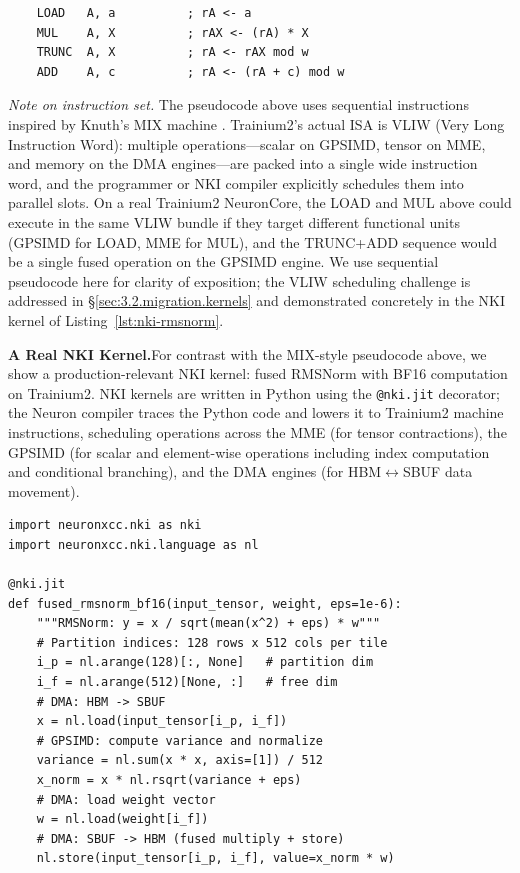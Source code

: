 \documentclass[12pt]{article}
\newcommand{\SBUF}{\textsc{SBUF}}                 %
\newcommand{\MME}{\textsc{MME}}                   %
\newcommand{\GPSIMD}{\textsc{GPSIMD}}             %
\begin{document}
\begin{verbatim}
    LOAD   A, a          ; rA <- a
    MUL    A, X          ; rAX <- (rA) * X
    TRUNC  A, X          ; rA <- rAX mod w
    ADD    A, c          ; rA <- (rA + c) mod w
\end{verbatim}

\noindent\textit{Note on instruction set.} The pseudocode above uses sequential instructions inspired by Knuth's MIX machine \citep{knuth1997taocp2}. Trainium2's actual ISA is VLIW (Very Long Instruction Word): multiple operations---scalar on \GPSIMD{}, tensor on \MME{}, and memory on the DMA engines---are packed into a single wide instruction word, and the programmer or NKI compiler explicitly schedules them into parallel slots. On a real Trainium2 NeuronCore, the LOAD and MUL above could execute in the same VLIW bundle if they target different functional units (\GPSIMD{} for LOAD, \MME{} for MUL), and the TRUNC+ADD sequence would be a single fused operation on the \GPSIMD{} engine. We use sequential pseudocode here for clarity of exposition; the VLIW scheduling challenge is addressed in \S\ref{sec:3.2.migration.kernels} and demonstrated concretely in the NKI kernel of Listing~\ref{lst:nki-rmsnorm}.

\medskip
\medskip\noindent\textbf{A Real NKI Kernel.}\quad For contrast with the MIX-style pseudocode above, we show a production-relevant NKI kernel: fused RMSNorm with BF16 computation on Trainium2. NKI kernels are written in Python using the \texttt{@nki.jit} decorator; the Neuron compiler traces the Python code and lowers it to Trainium2 machine instructions, scheduling operations across the \MME{} (for tensor contractions), the \GPSIMD{} (for scalar and element-wise operations including index computation and conditional branching), and the DMA engines (for HBM$\leftrightarrow$\SBUF{} data movement).

\begin{lstlisting}[language=NKI, caption={Fused RMSNorm kernel in NKI. The \texttt{nl.load}/\texttt{nl.store} calls generate DMA instructions; \texttt{nl.sum} and the arithmetic map to \GPSIMD{} scalar/vector operations; the partition dimensions \texttt{i\_p} (128 rows) and \texttt{i\_f} (512 columns) determine the \SBUF{} tile loaded per NeuronCore invocation.}, label={lst:nki-rmsnorm}]
import neuronxcc.nki as nki
import neuronxcc.nki.language as nl

@nki.jit
def fused_rmsnorm_bf16(input_tensor, weight, eps=1e-6):
    """RMSNorm: y = x / sqrt(mean(x^2) + eps) * w"""
    # Partition indices: 128 rows x 512 cols per tile
    i_p = nl.arange(128)[:, None]   # partition dim
    i_f = nl.arange(512)[None, :]   # free dim
    # DMA: HBM -> SBUF
    x = nl.load(input_tensor[i_p, i_f])
    # GPSIMD: compute variance and normalize
    variance = nl.sum(x * x, axis=[1]) / 512
    x_norm = x * nl.rsqrt(variance + eps)
    # DMA: load weight vector
    w = nl.load(weight[i_f])
    # DMA: SBUF -> HBM (fused multiply + store)
    nl.store(input_tensor[i_p, i_f], value=x_norm * w)
\end{lstlisting}
\end{document}
